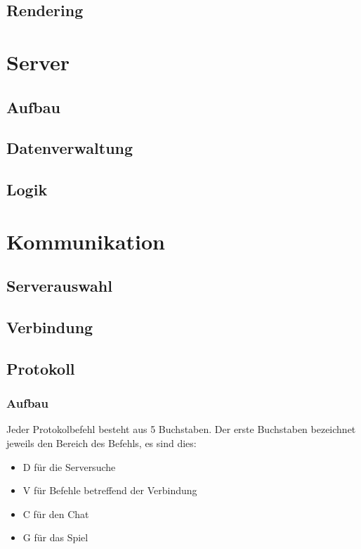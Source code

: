 \documentclass[ngerman, 12pt, pdftex]{scrartcl}[2006/07/30]
\begin{document}
\subsection{Rendering}


\section{Server}


\subsection{Aufbau}
\subsection{Datenverwaltung}


\subsection{Logik}


\section{Kommunikation}
\subsection{Serverauswahl}


\subsection{Verbindung}


\subsection{Protokoll}
\subsubsection{Aufbau}
Jeder Protokolbefehl besteht aus 5 Buchstaben. Der erste Buchstaben bezeichnet jeweils den Bereich des Befehls, es sind dies:
\begin{itemize}
\item D für die Serversuche
\item V für Befehle betreffend der Verbindung
\item C für den Chat
\item G für das Spiel
\end{itemize}
\end{document}
